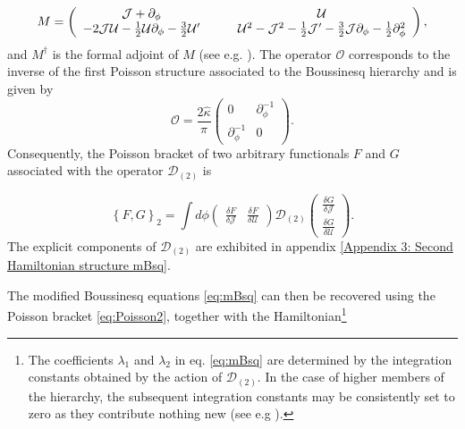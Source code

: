 \documentclass[letterpaper,11pt,oneside]{book}
\begin{document}
\begin{equation}
	M=\left(\begin{array}{cc}
		{\cal J}+\partial_{\phi}\qquad & \mathcal{U}\\
		-2{\cal J}\mathcal{U}-\frac{1}{2}\mathcal{U}\partial_{\phi}-\frac{3}{2}{\cal U}^{\prime}\qquad & \mathcal{U}^{2}-{\cal J}^{2}-\frac{1}{2}{\cal J}^{\prime}-\frac{3}{2}{\cal J}\partial_{\phi}-\frac{1}{2}\partial_{\phi}^{2}
	\end{array}\right),\label{eq:M}
\end{equation}
and $M^{\dagger}$ is the formal adjoint of $M$ (see e.g. \cite{Mathieu:1991}).
The operator $\mathcal{O}$ corresponds to the inverse of the first
Poisson structure associated to the Boussinesq hierarchy and is given by
\[
\mathcal{O}=\frac{2\hat{\kappa}}{\pi}\left(\begin{array}{cc}
	0 & \partial_{\phi}^{-1}\\
	\partial_{\phi}^{-1} & 0
\end{array}\right).
\]
Consequently, the Poisson bracket of two arbitrary functionals $F$
and $G$ associated with the operator $\mathcal{D}_{\left(2\right)}$
is

\begin{equation}
	\left\{ F,G\right\} _{2}=\int d\phi\left(\begin{array}{cc}
		\frac{\delta F}{\delta\mathcal{J}} & \frac{\delta F}{\delta\mathcal{U}}\end{array}\right)\mathcal{D}_{(2)}\left(\begin{array}{c}
		\frac{\delta G}{\delta\mathcal{J}}\\
		\frac{\delta G}{\delta\mathcal{U}}
	\end{array}\right).\label{eq:Poisson2}
\end{equation}
The explicit components of $\mathcal{D}_{\left(2\right)}$ are exhibited
in appendix \ref{Appendix 3: Second Hamiltonian structure mBsq}.

The modified Boussinesq equations \eqref{eq:mBsq} can then be recovered using the Poisson
bracket \eqref{eq:Poisson2}, together with the Hamiltonian\footnote{The coefficients $\lambda_{1}$ and $\lambda_{2}$ in eq. \eqref{eq:mBsq}
	are determined by the integration constants obtained by the action
	of $\mathcal{D}_{\left(2\right)}$. In the case of higher members
	of the hierarchy, the subsequent integration constants may be consistently
	set to zero as they contribute nothing new (see e.g \cite{Fordy:1981}).}
\end{document}

